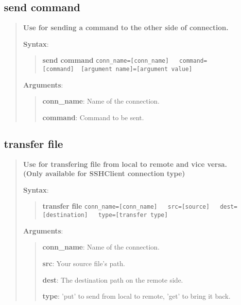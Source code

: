 \hypertarget{description-send-command}{%
\subsection{\texorpdfstring{\textbf{send
command}}{send command}}\label{description-send-command}}

\begin{quote}
\textbf{Use for sending a command to the other side of connection.}

\textbf{Syntax}:

\begin{quote}

\textbf{send command}
\texttt{conn\_name={[}conn\_name{]}\ \ \ command={[}command{]}\ \ {[}argument name{]}={[}argument value{]}}
\end{quote}

\textbf{Arguments}:

\begin{quote}
\textbf{conn\_name}: Name of the connection.

\textbf{command}: Command to be sent.
\end{quote}
\end{quote}

\hypertarget{description-transfer-file}{%
\subsection{\texorpdfstring{\textbf{transfer file}}{transfer file}}\label{description-transfer-file}}

\begin{quote}
\textbf{Use for transfering file from local to remote and vice versa. (Only available for SSHClient connection type)}

\textbf{Syntax}:

\begin{quote}

\textbf{transfer file}
\texttt{conn\_name={[}conn\_name{]}\ \ \ src={[}source{]}\ \ \ dest={[}destination{]}\ \ \ type={[}transfer type{]}}
\end{quote}

\textbf{Arguments}:

\begin{quote}
\textbf{conn\_name}: Name of the connection.

\textbf{src}: Your source file's path.

\textbf{dest}: The destination path on the remote side.

\textbf{type}: 'put' to send from local to remote, 'get' to bring it back.
\end{quote}
\end{quote}

